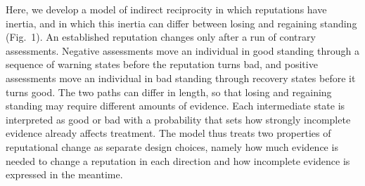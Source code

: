 Here, we develop a model of indirect reciprocity in which reputations have inertia, and in which this inertia can differ between losing and regaining standing (Fig.~1). An established reputation changes only after a run of contrary assessments. Negative assessments move an individual in good standing through a sequence of warning states before the reputation turns bad, and positive assessments move an individual in bad standing through recovery states before it turns good. The two paths can differ in length, so that losing and regaining standing may require different amounts of evidence. Each intermediate state is interpreted as good or bad with a probability that sets how strongly incomplete evidence already affects treatment. The model thus treats two properties of reputational change as separate design choices, namely how much evidence is needed to change a reputation in each direction and how incomplete evidence is expressed in the meantime.
